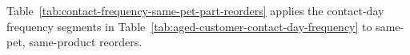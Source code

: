 Table~\ref{tab:contact-frequency-same-pet-part-reorders} applies the contact-day
frequency segments in Table~\ref{tab:aged-customer-contact-day-frequency}
to same-pet, same-product reorders.




\clearpage
